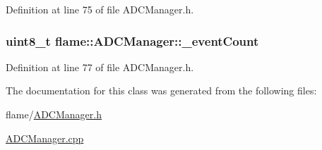 Definition at line 75 of file A\-D\-C\-Manager.\-h.

\hypertarget{classflame_1_1_a_d_c_manager_a92c716e93c9adff0bf1faf8f3a2d68ef}{
\subsubsection[{\-\_\-event\-Count}]{\setlength{\rightskip}{0pt plus 5cm}uint8\-\_\-t flame\-::\-A\-D\-C\-Manager\-::\-\_\-event\-Count\hspace{0.3cm}{\ttfamily [protected]}}}\label{classflame_1_1_a_d_c_manager_a92c716e93c9adff0bf1faf8f3a2d68ef}


Definition at line 77 of file A\-D\-C\-Manager.\-h.



The documentation for this class was generated from the following files\-:\begin{DoxyCompactItemize}
\item 
flame/\hyperlink{_a_d_c_manager_8h}{A\-D\-C\-Manager.\-h}\item 
\hyperlink{_a_d_c_manager_8cpp}{A\-D\-C\-Manager.\-cpp}\end{DoxyCompactItemize}
